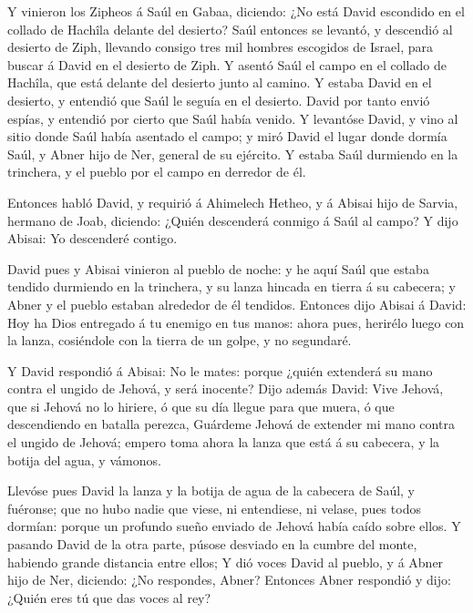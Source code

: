  Y vinieron los Zipheos á Saúl en Gabaa, diciendo: ¿No está
David escondido en el collado de Hachîla delante del desierto?
 Saúl entonces se levantó, y descendió al desierto de Ziph,
llevando consigo tres mil hombres escogidos de Israel, para buscar á
David en el desierto de Ziph.  Y asentó Saúl el campo en el
collado de Hachîla, que está delante del desierto junto al camino. Y
estaba David en el desierto, y entendió que Saúl le seguía en el
desierto.  David por tanto envió espías, y entendió por
cierto que Saúl había venido.  Y levantóse David, y vino al
sitio donde Saúl había asentado el campo; y miró David el lugar donde
dormía Saúl, y Abner hijo de Ner, general de su ejército. Y estaba Saúl
durmiendo en la trinchera, y el pueblo por el campo en derredor de él.

 Entonces habló David, y requirió á Ahimelech Hetheo, y á
Abisai hijo de Sarvia, hermano de Joab, diciendo: ¿Quién descenderá
conmigo á Saúl al campo? Y dijo Abisai: Yo descenderé contigo.

 David pues y Abisai vinieron al pueblo de noche: y he aquí
Saúl que estaba tendido durmiendo en la trinchera, y su lanza hincada en
tierra á su cabecera; y Abner y el pueblo estaban alrededor de él
tendidos.  Entonces dijo Abisai á David: Hoy ha Dios
entregado á tu enemigo en tus manos: ahora pues, herirélo luego con la
lanza, cosiéndole con la tierra de un golpe, y no segundaré.

 Y David respondió á Abisai: No le mates: porque ¿quién
extenderá su mano contra el ungido de Jehová, y será inocente?
 Dijo además David: Vive Jehová, que si Jehová no lo
hiriere, ó que su día llegue para que muera, ó que descendiendo en
batalla perezca,  Guárdeme Jehová de extender mi mano
contra el ungido de Jehová; empero toma ahora la lanza que está á su
cabecera, y la botija del agua, y vámonos.

 Llevóse pues David la lanza y la botija de agua de la
cabecera de Saúl, y fuéronse; que no hubo nadie que viese, ni
entendiese, ni velase, pues todos dormían: porque un profundo sueño
enviado de Jehová había caído sobre ellos.  Y pasando David
de la otra parte, púsose desviado en la cumbre del monte, habiendo
grande distancia entre ellos;  Y dió voces David al pueblo,
y á Abner hijo de Ner, diciendo: ¿No respondes, Abner? Entonces Abner
respondió y dijo: ¿Quién eres tú que das voces al rey?

